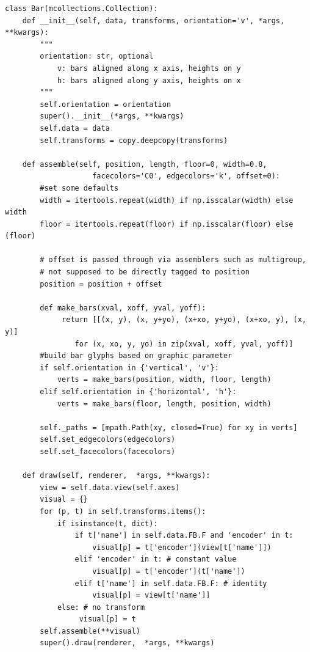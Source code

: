 \documentclass[../main.tex]{subfiles}
\begin{document}
\begin{verbatim}
class Bar(mcollections.Collection):
    def __init__(self, data, transforms, orientation='v', *args, **kwargs):
        """
        orientation: str, optional
            v: bars aligned along x axis, heights on y
            h: bars aligned along y axis, heights on x
        """
        self.orientation = orientation
        super().__init__(*args, **kwargs)
        self.data = data
        self.transforms = copy.deepcopy(transforms)

    def assemble(self, position, length, floor=0, width=0.8, 
                    facecolors='C0', edgecolors='k', offset=0):
        #set some defaults
        width = itertools.repeat(width) if np.isscalar(width) else width
        floor = itertools.repeat(floor) if np.isscalar(floor) else (floor)
        
        # offset is passed through via assemblers such as multigroup, 
        # not supposed to be directly tagged to position 
        position = position + offset
        
        def make_bars(xval, xoff, yval, yoff):
             return [[(x, y), (x, y+yo), (x+xo, y+yo), (x+xo, y), (x, y)] 
                for (x, xo, y, yo) in zip(xval, xoff, yval, yoff)]
        #build bar glyphs based on graphic parameter
        if self.orientation in {'vertical', 'v'}:
            verts = make_bars(position, width, floor, length)
        elif self.orientation in {'horizontal', 'h'}:
            verts = make_bars(floor, length, position, width)
        
        self._paths = [mpath.Path(xy, closed=True) for xy in verts]
        self.set_edgecolors(edgecolors)
        self.set_facecolors(facecolors)
        
    def draw(self, renderer,  *args, **kwargs):
        view = self.data.view(self.axes)
        visual = {}
        for (p, t) in self.transforms.items():
            if isinstance(t, dict):
                if t['name'] in self.data.FB.F and 'encoder' in t:
                    visual[p] = t['encoder'](view[t['name']])
                elif 'encoder' in t: # constant value
                    visual[p] = t['encoder'](t['name'])
                elif t['name'] in self.data.FB.F: # identity 
                    visual[p] = view[t['name']]
            else: # no transform 
                 visual[p] = t
        self.assemble(**visual)
        super().draw(renderer,  *args, **kwargs)
    
\end{verbatim}
\end{document}
